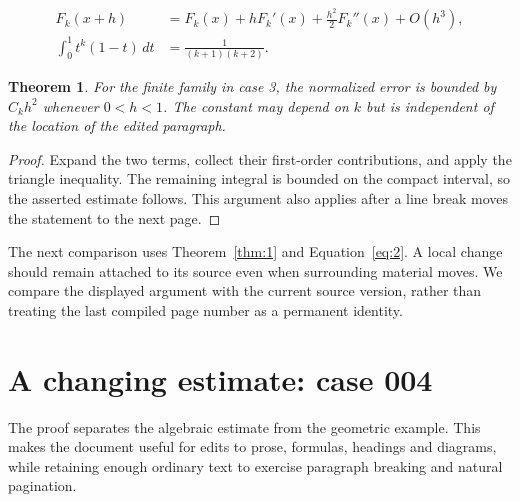\documentclass[a4paper,10pt]{article}
\newtheorem{theorem}{Theorem}[section]
\begin{document}
\lipsum[7-8]
\begin{align}\label{eq:2}
 F_k(x+h)&=F_k(x)+hF_k'(x)+\frac{h^2}{2}F_k''(x)+O(h^3),\\
 \int_0^1 t^k(1-t)\,dt&=\frac{1}{(k+1)(k+2)}.
\end{align}
\begin{theorem}\label{thm:2}
For the finite family in case 3, the normalized error is bounded by $C_k h^2$ whenever $0<h<1$. The constant may depend on $k$ but is independent of the location of the edited paragraph.
\end{theorem}
\begin{proof}
Expand the two terms, collect their first-order contributions, and apply the
triangle inequality. The remaining integral is bounded on the compact interval,
so the asserted estimate follows. This argument also applies after a line break
moves the statement to the next page.
\end{proof}
The next comparison uses Theorem~\ref{thm:1} and Equation~\ref{eq:2}. A local change should remain attached to its source even when surrounding material moves. We compare the displayed argument with the current source version, rather than treating the last compiled page number as a permanent identity.

\lipsum[13]

\section{A changing estimate: case 004}\label{unit:3}
The proof separates the algebraic estimate from the geometric example. This makes the document useful for edits to prose, formulas, headings and diagrams, while retaining enough ordinary text to exercise paragraph breaking and natural pagination.
\end{document}
